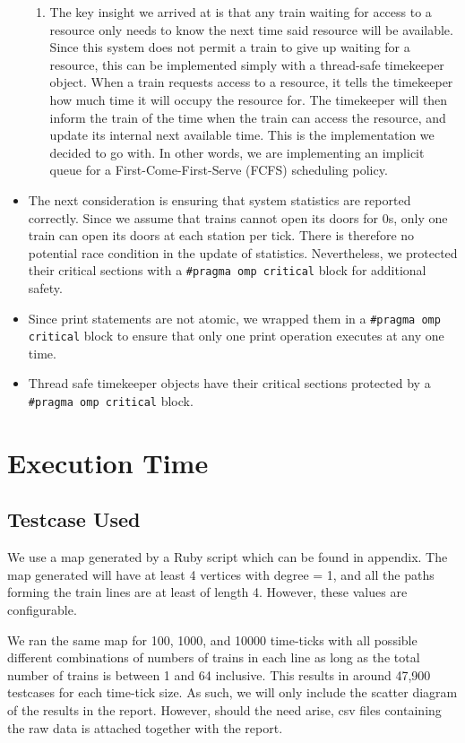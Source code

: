 \documentclass[a4paper,12pt]{article}
\begin{document}
\begin{itemize}
\begin{enumerate}
		      \item The key insight we arrived at is that any train waiting for access to a resource only needs to know the next time said resource will be available. Since this system does not permit a train to give up waiting for a resource, this can be implemented simply with a thread-safe timekeeper object. When a train requests access to a resource, it tells the timekeeper how much time it will occupy the resource for. The timekeeper will then inform the train of the time when the train can access the resource, and update its internal next available time. This is the implementation we decided to go with. In other words, we are implementing an implicit queue for a First-Come-First-Serve (FCFS) scheduling policy.
	      \end{enumerate}
	\item The next consideration is ensuring that system statistics are reported correctly. Since we assume that trains cannot open its doors for 0s, only one train can open its doors at each station per tick. There is therefore no potential race condition in the update of statistics. Nevertheless, we protected their critical sections with a \texttt{#pragma omp critical} block for additional safety.
	\item Since print statements are not atomic, we wrapped them in a \texttt{#pragma omp critical} block to ensure that only one print operation executes at any one time.
	\item Thread safe timekeeper objects have their critical sections protected by a \texttt{#pragma omp critical} block.
\end{itemize}

\section{Execution Time}

\subsection{Testcase Used}
We use a map generated by a Ruby script which can be found in appendix. The map generated will have at least 4 vertices with degree = 1, and all the paths forming the train lines are at least of length 4. However, these values are configurable.

We ran the same map for 100, 1000, and 10000 time-ticks with all possible different combinations of numbers of trains in each line as long as the total number of trains is between 1 and 64 inclusive. This results in around 47,900 testcases for each time-tick size. As such, we will only include the scatter diagram of the results in the report. However, should the need arise, csv files containing the raw data is attached together with the report.
\end{document}
